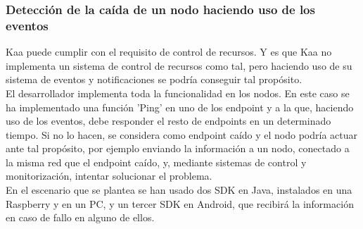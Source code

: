 \documentclass[12pt, twoside]{book}
\begin{document}
\subsubsection*{Detección de la caída de un nodo haciendo uso de los eventos}
Kaa puede cumplir con el requisito de control de recursos. Y es que Kaa  no implementa un sistema de control de recursos como tal, pero haciendo uso de su sistema de eventos y notificaciones se podría conseguir tal propósito.\\
El desarrollador implementa toda la funcionalidad en los nodos. En este caso se ha implementado una función 'Ping' en uno de los endpoint y a la que, haciendo uso de los eventos, debe responder el resto de endpoints en un determinado tiempo. Si no lo hacen, se considera como endpoint caído y el nodo podría actuar ante tal propósito, por ejemplo enviando la información a un nodo, conectado a la misma red que el endpoint caído, y, mediante sistemas de control y monitorización, intentar solucionar el problema. \\
En el escenario que se plantea se han usado dos SDK en Java, instalados en una Raspberry y en un PC, y un tercer SDK en Android, que recibirá la información en caso de fallo en alguno de ellos.\\
\end{document}
